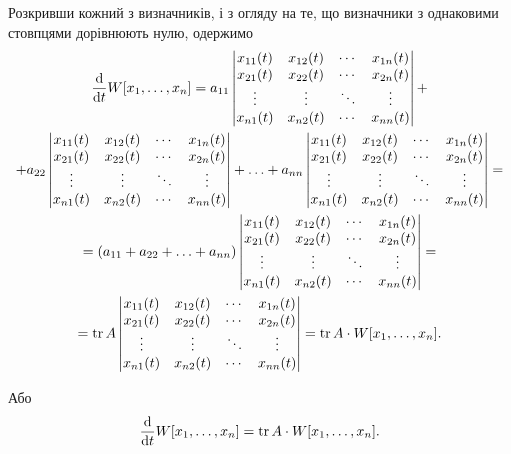 Розкривши кожний з визначників, і з огляду на те, що визначники з однаковими стовпцями дорівнюють нулю, одержимо
\begin{multline*}
	\frac{\mathop{}\!\mathrm{d}}{\mathop{}\!\mathrm{d} t} W[x_1, \ldots, x_n] = a_{11} \begin{vmatrix} x_{11}(t) & x_{12}(t) & \cdots & x_{1n}(t) \\ x_{21}(t) & x_{22}(t) & \cdots & x_{2n}(t) \\ \vdots & \vdots & \ddots & \vdots \\ x_{n1}(t) & x_{n2}(t) & \cdots & x_{nn}(t) \end{vmatrix} + \\
	+ a_{22} \begin{vmatrix} x_{11}(t) & x_{12}(t) & \cdots & x_{1n}(t) \\ x_{21}(t) & x_{22}(t) & \cdots & x_{2n}(t) \\ \vdots & \vdots & \ddots & \vdots \\ x_{n1}(t) & x_{n2}(t) & \cdots & x_{nn}(t) \end{vmatrix} + \ldots + a_{nn} \begin{vmatrix} x_{11}(t) & x_{12}(t) & \cdots & x_{1n}(t) \\ x_{21}(t) & x_{22}(t) & \cdots & x_{2n}(t) \\ \vdots & \vdots & \ddots & \vdots \\ x_{n1}(t) & x_{n2}(t) & \cdots & x_{nn}(t) \end{vmatrix} = \\
	= (a_{11} + a_{22} + \ldots + a_{nn}) \begin{vmatrix} x_{11}(t) & x_{12}(t) & \cdots & x_{1n}(t) \\ x_{21}(t) & x_{22}(t) & \cdots & x_{2n}(t) \\ \vdots & \vdots & \ddots & \vdots \\ x_{n1}(t) & x_{n2}(t) & \cdots & x_{nn}(t) \end{vmatrix} = \\
	= \operatorname{tr} A \begin{vmatrix} x_{11}(t) & x_{12}(t) & \cdots & x_{1n}(t) \\ x_{21}(t) & x_{22}(t) & \cdots & x_{2n}(t) \\ \vdots & \vdots & \ddots & \vdots \\ x_{n1}(t) & x_{n2}(t) & \cdots & x_{nn}(t) \end{vmatrix} = \operatorname{tr} A \cdot W[x_1, \ldots, x_n].
\end{multline*}

Або
\begin{equation*}
	\frac{\mathop{}\!\mathrm{d}}{\mathop{}\!\mathrm{d} t} W[x_1, \ldots, x_n] = \operatorname{tr} A \cdot W[x_1, \ldots, x_n].
\end{equation*}

